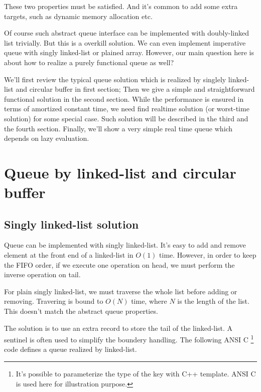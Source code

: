 \documentclass{article}
\begin{document}
These two properties must be satisfied. And it's common to add some extra
targets, such as dynamic memory allocation etc.

Of course such abstract queue interface can be implemented with 
doubly-linked list trivially. But this is a overkill solution. 
We can even implement imperative queue with singly linked-list or
plained array. However, our main question here is about how to realize
a purely functional queue as well?

We'll first review the typical queue solution which is realized by
singlely linked-list and circular buffer in first section; Then we
give a simple and straightforward functional solution in the second
section. While the performance is ensured in terms of amortized
constant time, we need find realtime solution (or worst-time solution)
for some special case. Such solution will be described in the third
and the fourth section. Finally, we'll show a very simple real time
queue which depends on lazy evaluation.

\section{Queue by linked-list and circular buffer}

\subsection{Singly linked-list solution}

Queue can be implemented with singly linked-list. It's easy to add 
and remove element at the front end of a linked-list in $O(1)$ time. 
However, in
order to keep the FIFO order, if we execute one operation on head,
we must perform the inverse operation on tail.

For plain singly linked-list, we must traverse the whole list before
adding or removing. Travering is bound to $O(N)$ time, 
where $N$ is the length of the list. This doesn't match the abstract
queue properties.

The solution is to use an extra record to store the tail of the linked-list.
A sentinel is often used to simplify the boundery handling. The 
following ANSI C \footnote{It's possible to parameterize the type of the key
with C++ template. ANSI C is used here for illustration purpose.} 
code defines a queue realized by linked-list.
\end{document}
